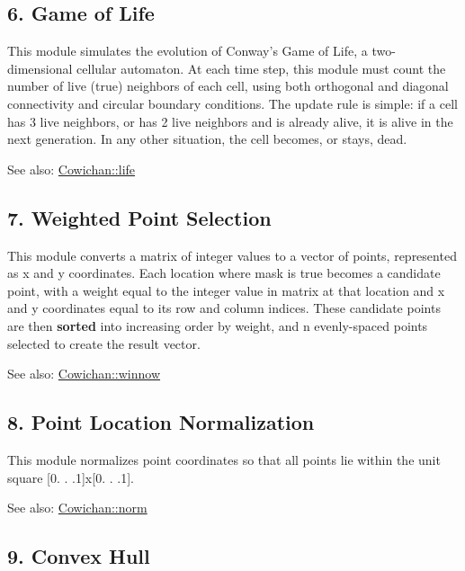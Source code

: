 \hypertarget{index_life_sec}{}\subsection{6. Game of Life}\label{index_life_sec}
This module simulates the evolution of Conway's Game of Life, a two-dimensional cellular automaton. At each time step, this module must count the number of live (true) neighbors of each cell, using both orthogonal and diagonal connectivity and circular boundary conditions. The update rule is simple: if a cell has 3 live neighbors, or has 2 live neighbors and is already alive, it is alive in the next generation. In any other situation, the cell becomes, or stays, dead. \begin{Desc}
\item[See also:]\hyperlink{class_cowichan_d449595ef2fe934bdd128ac8b1f51d07}{Cowichan::life}\end{Desc}
\hypertarget{index_winnow_sec}{}\subsection{7. Weighted Point Selection}\label{index_winnow_sec}
This module converts a matrix of integer values to a vector of points, represented as x and y coordinates. Each location where mask is true becomes a candidate point, with a weight equal to the integer value in matrix at that location and x and y coordinates equal to its row and column indices. These candidate points are then {\bf sorted} into increasing order by weight, and n evenly-spaced points selected to create the result vector. \begin{Desc}
\item[See also:]\hyperlink{class_cowichan_13d60e06ced3b5da79d62c133ce82337}{Cowichan::winnow}\end{Desc}
\hypertarget{index_norm_sec}{}\subsection{8. Point Location Normalization}\label{index_norm_sec}
This module normalizes point coordinates so that all points lie within the unit square \mbox{[}0. . .1\mbox{]}x\mbox{[}0. . .1\mbox{]}. \begin{Desc}
\item[See also:]\hyperlink{class_cowichan_3df21e3c627958114e045c3559a29f30}{Cowichan::norm}\end{Desc}
\hypertarget{index_hull_sec}{}\subsection{9. Convex Hull}\label{index_hull_sec}
